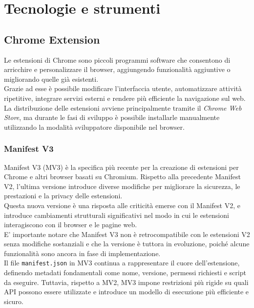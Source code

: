 \section{Tecnologie e strumenti}
\subsection{Chrome Extension}
\noindent Le estensioni di Chrome sono piccoli programmi software che consentono di arricchire e personalizzare il browser, aggiungendo funzionalità aggiuntive o migliorando quelle già esistenti.\\
Grazie ad esse è possibile modificare l’interfaccia utente, automatizzare attività ripetitive, integrare servizi esterni e rendere più efficiente la navigazione sul web.\\ 
La distribuzione delle estensioni avviene principalmente tramite il \textit{Chrome Web Store}, ma durante le fasi di sviluppo è possibile installarle manualmente utilizzando la modalità sviluppatore disponibile nel browser.

\subsubsection{Manifest V3}
\noindent Manifest V3 (MV3) è la specifica più recente per la creazione di estensioni per Chrome e altri browser basati su Chromium. Rispetto alla precedente Manifest V2, l'ultima versione introduce diverse modifiche per migliorare la sicurezza, le prestazioni e la privacy delle estensioni.  \\
Questa nuova versione è una risposta alle criticità emerse con il Manifest V2, e introduce cambiamenti strutturali significativi nel modo in cui le estensioni interagiscono con il browser e le pagine web.\\
E' importante notare che Manifest V3 non è retrocompatibile con le estensioni V2 senza modifiche sostanziali e che la versione è tuttora in evoluzione, poiché alcune funzionalità sono ancora in fase di implementazione.\\
Il file \texttt{manifest.json} in MV3 continua a rappresentare il cuore dell’estensione, definendo metadati fondamentali come nome, versione, permessi richiesti e script da eseguire. Tuttavia, rispetto a MV2, MV3 impone restrizioni più rigide su quali API possono essere utilizzate e introduce un modello di esecuzione più efficiente e sicuro.\\

